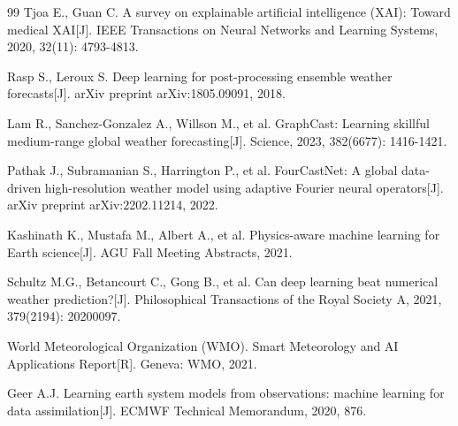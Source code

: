 \documentclass{article}
\begin{document}
\begin{thebibliography}{99}
Tjoa E., Guan C. A survey on explainable artificial intelligence (XAI): Toward medical XAI[J]. IEEE Transactions on Neural Networks and Learning Systems, 2020, 32(11): 4793-4813.

Rasp S., Leroux S. Deep learning for post-processing ensemble weather forecasts[J]. arXiv preprint arXiv:1805.09091, 2018.

Lam R., Sanchez-Gonzalez A., Willson M., et al. GraphCast: Learning skillful medium-range global weather forecasting[J]. Science, 2023, 382(6677): 1416-1421.

Pathak J., Subramanian S., Harrington P., et al. FourCastNet: A global data-driven high-resolution weather model using adaptive Fourier neural operators[J]. arXiv preprint arXiv:2202.11214, 2022.

Kashinath K., Mustafa M., Albert A., et al. Physics-aware machine learning for Earth science[J]. AGU Fall Meeting Abstracts, 2021.

Schultz M.G., Betancourt C., Gong B., et al. Can deep learning beat numerical weather prediction?[J]. Philosophical Transactions of the Royal Society A, 2021, 379(2194): 20200097.

World Meteorological Organization (WMO). Smart Meteorology and AI Applications Report[R]. Geneva: WMO, 2021.

Geer A.J. Learning earth system models from observations: machine learning for data assimilation[J]. ECMWF Technical Memorandum, 2020, 876.

\end{thebibliography}
\end{document}
